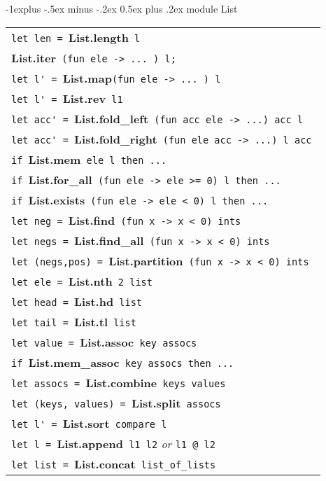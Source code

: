 \documentclass[10pt,landscape]{article}
\makeatletter
\renewcommand{\subsection}{\@startsection{subsection}{2}{0mm}%
                                {-1explus -.5ex minus -.2ex}%
                                {0.5ex plus .2ex}%
                                {\normalfont\normalsize\bfseries}}
\makeatother
\begin{document}
\begin{multicols}{3}
\subsection{module List}
\vspace{-0.4em}
\begin{tabular}{|p{70mm}}\hline\vspace{0.1em}
\verb!let len = !{\bf List.length}\verb! l!\\
\verb!!{\bf List.iter}\verb! (fun ele -> ... ) l;! \\
\verb!let l' = !{\bf List.map}\verb!(fun ele -> ... ) l! \\
\verb!let l' = !{\bf List.rev}\verb! l1! \\
\verb!let acc' = !{\bf List.fold\_left}\verb! (fun acc ele -> ...) acc l! \\
\verb!let acc' = !{\bf List.fold\_right}\verb! (fun ele acc -> ...) l acc! \\
\verb!if !{\bf List.mem}\verb! ele l then ...!\\
\verb!if !{\bf List.for\_all}\verb! (fun ele -> ele >= 0) l then ...!\\
\verb!if !{\bf List.exists}\verb! (fun ele -> ele < 0) l then ...!\\
\verb!let neg = !{\bf List.find}\verb! (fun x -> x < 0) ints !\\
\verb!let negs = !{\bf List.find\_all}\verb! (fun x -> x < 0) ints !\\
\verb!let (negs,pos) = !{\bf List.partition}\verb! (fun x -> x < 0) ints !\\
\verb!let ele = !{\bf List.nth}\verb! 2 list!\\
\verb!let head = !{\bf List.hd}\verb! list!\\
\verb!let tail = !{\bf List.tl}\verb! list!\\
\verb!let value = !{\bf List.assoc}\verb! key assocs!\\
\verb!if !{\bf List.mem\_assoc}\verb! key assocs then ...!\\
\verb!let assocs = !{\bf List.combine}\verb! keys values!\\
\verb!let (keys, values) = !{\bf List.split}\verb! assocs!\\
\verb!let l' = !{\bf List.sort}\verb! compare l!\\
\verb!let l = !{\bf List.append}\verb! l1 l2! \emph{or} \verb!l1 @ l2!\\
\verb!let list = !{\bf List.concat}\verb! list_of_lists!\\
\end{tabular}


\end{multicols}
\end{document}
